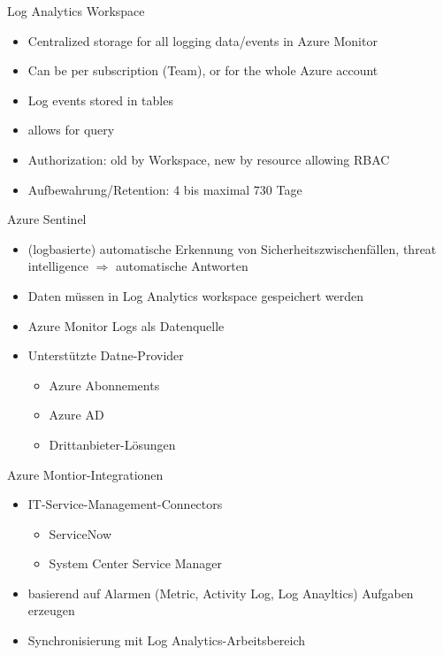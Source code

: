 \begin{flashcard}[Definition]{Log Analytics Workspace}
  \begin{itemize}
    \item Centralized storage for all logging data/events in Azure Monitor
    \item Can be per subscription (Team), or for the whole Azure account
    \item Log events stored in tables
    \item allows for query
    \item Authorization: old by Workspace, new by resource allowing RBAC
    \item Aufbewahrung/Retention: 4 bis maximal 730 Tage
  \end{itemize}
\end{flashcard}

\begin{flashcard}[Definition]{Azure Sentinel}
  \begin{itemize}
    \item (logbasierte) automatische Erkennung von Sicherheitszwischenfällen, threat intelligence\newline
      $\Rightarrow$ automatische Antworten
    \item Daten müssen in Log Analytics workspace gespeichert werden
    \item Azure Monitor Logs als Datenquelle
    \item Unterstützte Datne-Provider
      \begin{itemize}
        \item Azure Abonnements
        \item Azure AD
        \item Drittanbieter-Lösungen
      \end{itemize}
  \end{itemize}
\end{flashcard}

\begin{flashcard}[Definition]{Azure Montior-Integrationen}
  \begin{itemize}
    \item IT-Service-Management-Connectors
      \begin{itemize}
        \item ServiceNow
        \item System Center Service Manager
      \end{itemize}
    \item basierend auf Alarmen (Metric, Activity Log, Log Anayltics) Aufgaben erzeugen
    \item Synchronisierung mit Log Analytics-Arbeitsbereich
  \end{itemize}
\end{flashcard}

